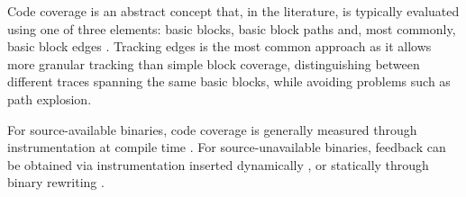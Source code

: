\begin{algorithm}
\caption{Basic Evolutionary Fuzzing}\label{alg:evolfuzzing}
    
\end{algorithm}

Code coverage is an abstract concept that, in the literature, is typically evaluated using one of three elements: basic blocks, basic block paths and, most commonly, basic block edges \cite{fioraldi2020afl++, honggfuzz, libfuzzer, zalewski2014afltech}. Tracking edges is the most common approach as it allows more granular tracking than simple block coverage, distinguishing between different traces spanning the same basic blocks, while avoiding problems such as path explosion.

For source-available binaries, code coverage is generally measured through instrumentation at compile time \cite{honggfuzz, zalewski2014afltech}. For source-unavailable binaries, feedback can be obtained via instrumentation inserted dynamically \cite{fioraldi2020afl++, rawat2017vuzzer}, or statically through binary rewriting \cite{dinesh2020retrowrite}.